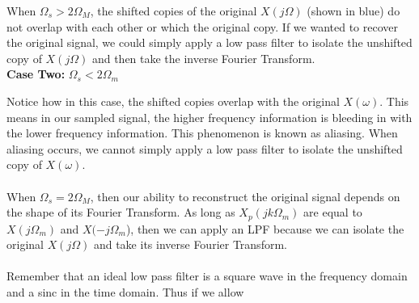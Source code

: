\documentclass{article}
\begin{document}
When $\Omega_s > 2\Omega_M$, the shifted copies of the original $X(j\Omega)$ (shown in blue)
do not overlap with each other or which the original copy. If we wanted to recover the original
signal, we could simply apply a low pass filter to isolate the unshifted copy of $X(j\Omega)$ and
then take the inverse Fourier Transform.\\
\textbf{Case Two: }$\Omega_s < 2\Omega_m$
\begin{figure}[H]
    \centering
\end{figure}
Notice how in this case, the shifted copies overlap with the original $X(\omega)$. This means in our sampled signal, the higher frequency
information is bleeding in with the lower frequency information. This phenomenon is known as aliasing. When aliasing occurs, we cannot simply
apply a low pass filter to isolate the unshifted copy of $X(\omega)$.\\\\
When $\Omega_s = 2\Omega_M$, then our ability to reconstruct the original signal depends on the shape of its Fourier Transform. As long as $X_p(jk\Omega_m)$
are equal to $X(j\Omega_m)$ and $X(-j\Omega_m$), then we can apply an LPF because we can isolate the original $X(j\Omega)$ and take its inverse Fourier Transform.\\\\
Remember that an ideal low pass filter is a square wave in the frequency domain and a sinc in the time domain. Thus if we allow
\end{document}
